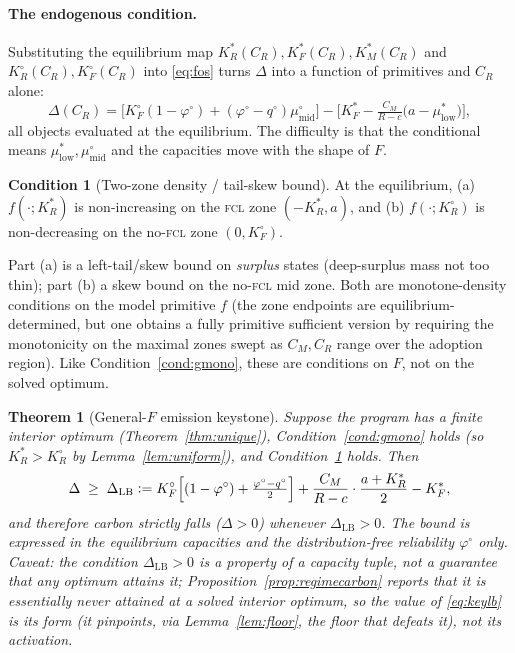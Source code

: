 \documentclass[11pt,reqno]{amsart}
\theoremstyle{plain}
\newtheorem{theorem}{Theorem}
\theoremstyle{definition}
\newtheorem{condition}{Condition}
\theoremstyle{remark}
\newcommand{\KR}{K_R}
\newcommand{\KF}{K_F}
\newcommand{\KM}{K_M}
\newcommand{\KRs}{K_R^{*}}
\newcommand{\KFs}{K_F^{*}}
\newcommand{\KRo}{K_R^{\circ}}
\newcommand{\KFo}{K_F^{\circ}}
\newcommand{\CM}{C_M}
\newcommand{\CR}{C_R}
\newcommand{\eqdef}{\vcentcolon=}
\begin{document}
\paragraph{The endogenous condition.}
Substituting the equilibrium map $\KR^{*}(\CR),\KF^{*}(\CR),\KM^{*}(\CR)$ and
$\KR^{\circ}(\CR),\KF^{\circ}(\CR)$ into \eqref{eq:fos} turns $\Delta$ into a
function of primitives and $\CR$ alone:
\begin{equation}\label{eq:endo}
  \Delta(\CR)=\Big[\KFo(1-\varphi^{\circ})+(\varphi^{\circ}-q^{\circ})\mu^{\circ}_{\mathrm{mid}}\Big]
  -\Big[\KFs-\tfrac{\CM}{R-c}\big(a-\mu^{*}_{\mathrm{low}}\big)\Big],
\end{equation}
all objects evaluated at the equilibrium. The difficulty is that the conditional
means $\mu^{*}_{\mathrm{low}},\mu^{\circ}_{\mathrm{mid}}$ and the capacities move
with the shape of $F$.

\begin{condition}[Two-zone density / tail-skew bound]\label{cond:zones}
At the equilibrium, (a) $f(\cdot;\KRs)$ is non-increasing on the \textsc{fcl} zone
$(-\KRs,a)$, and (b) $f(\cdot;\KRo)$ is non-decreasing on the no-\textsc{fcl} zone
$(0,\KFo)$.
\end{condition}

Part (a) is a left-tail/skew bound on \emph{surplus} states (deep-surplus mass
not too thin); part (b) a skew bound on the no-\textsc{fcl} mid zone. Both are
monotone-density conditions on the model primitive $f$ (the zone endpoints are
equilibrium-determined, but one obtains a fully primitive sufficient version by
requiring the monotonicity on the maximal zones swept as $\CM,\CR$ range over the
adoption region). Like Condition~\ref{cond:gmono}, these are conditions on $F$, not
on the solved optimum.

\begin{theorem}[General-$F$ emission keystone]\label{thm:keystone}
Suppose the program has a finite interior optimum (Theorem~\ref{thm:unique}),
Condition~\ref{cond:gmono} holds (so $\KRs>\KRo$ by Lemma~\ref{lem:uniform}), and
Condition~\ref{cond:zones} holds. Then
\begin{equation}\label{eq:keylb}
  \Delta\;\ge\;\Delta_{\mathrm{LB}}
  \eqdef \KFo\Big[(1-\varphi^{\circ})+\tfrac{\varphi^{\circ}-q^{\circ}}{2}\Big]
  +\frac{\CM}{R-c}\cdot\frac{a+\KRs}{2}-\KFs ,
\end{equation}
and therefore carbon strictly falls ($\Delta>0$) whenever
$\Delta_{\mathrm{LB}}>0$. The bound is expressed in the equilibrium capacities and
the distribution-free reliability $\varphi^{\circ}$ only. \emph{Caveat:} the
condition $\Delta_{\mathrm{LB}}>0$ is a property of a capacity tuple, not a
guarantee that any optimum attains it; Proposition~\ref{prop:regimecarbon} reports
that it is essentially never attained at a solved interior optimum, so the value of
\eqref{eq:keylb} is its \emph{form} (it pinpoints, via Lemma~\ref{lem:floor}, the
floor that defeats it), not its activation.
\end{theorem}
\end{document}

